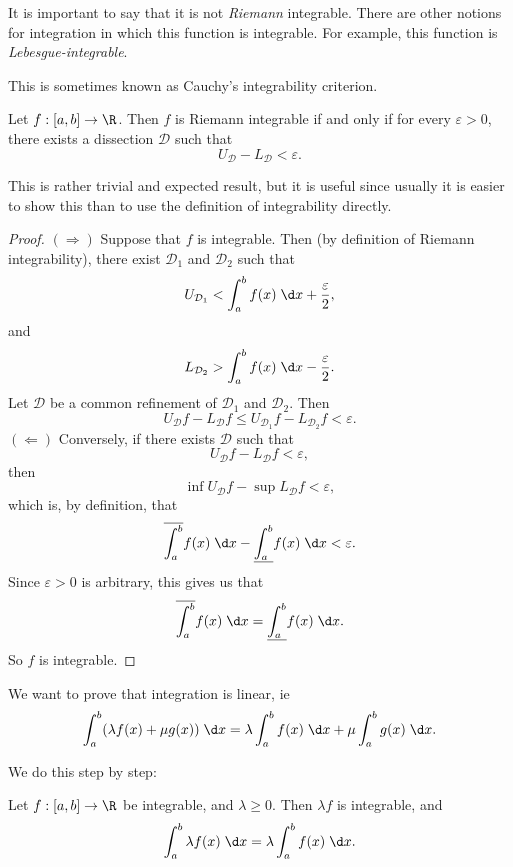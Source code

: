 \documentclass[a4paper]{article}
\begin{document}
\note It is important to say that it is not \emph{Riemann} integrable. There are other notions for integration in which this function is integrable. For example, this function is \emph{Lebesgue-integrable}.

\begin{prop}
  This is sometimes known as Cauchy's integrability criterion.

  Let $f: [a, b] \to \R$. Then $f$ is Riemann integrable if and only if for every $\varepsilon > 0$, there exists a dissection $\mathcal{D}$ such that
  \[
    U_\mathcal{D} - L_\mathcal{D} < \varepsilon.
  \]
\end{prop}
This is rather trivial and expected result, but it is useful since usually it is easier to show this than to use the definition of integrability directly.

\begin{proof}
  $(\Rightarrow)$ Suppose that $f$ is integrable. Then (by definition of Riemann integrability), there exist $\mathcal{D}_1$ and $\mathcal{D}_2$ such that
  \[
    U_{\mathcal{D}_1} < \int_a^b f(x)\;\d x + \frac{\varepsilon}{2},
  \]
  and
  \[
    L_{\mathcal{D}_2} > \int_a^b f(x)\;\d x - \frac{\varepsilon}{2}.
  \]
  Let $\mathcal{D}$ be a common refinement of $\mathcal{D}_1$ and $\mathcal{D}_2$. Then
  \[
    U_\mathcal{D} f - L_\mathcal{D} f \leq U_{\mathcal{D}_1} f- L_{\mathcal{D}_2} f < \varepsilon.
  \]
  $(\Leftarrow)$ Conversely, if there exists $\mathcal{D}$ such that
  \[
    U_\mathcal{D} f - L_\mathcal{D}f < \varepsilon,
  \]
  then
  \[
    \inf U_\mathcal{D} f - \sup L_\mathcal{D} f < \varepsilon,
  \]
  which is, by definition, that
  \[
    \overline{\int_a^b} f(x)\;\d x - \underline{\int_a^b} f(x)\;\d x < \varepsilon.
  \]
  Since $\varepsilon > 0$ is arbitrary, this gives us that
  \[
    \overline{\int_a^b} f(x)\;\d x = \underline{\int_a^b} f(x)\;\d x.
  \]
  So $f$ is integrable.
\end{proof}

We want to prove that integration is linear, ie
\[
  \int_a^b (\lambda f(x) + \mu g(x))\;\d x = \lambda\int_a^b f(x)\;\d x + \mu\int_a^bg(x)\;\d x.
\]

We do this step by step:
\begin{prop}
  Let $f: [a, b] \to \R$ be integrable, and $\lambda \geq 0$. Then $\lambda f$ is integrable, and
  \[
    \int_a^b \lambda f(x)\;\d x = \lambda\int_a^b f(x)\;\d x.
  \]
\end{prop}
\end{document}
